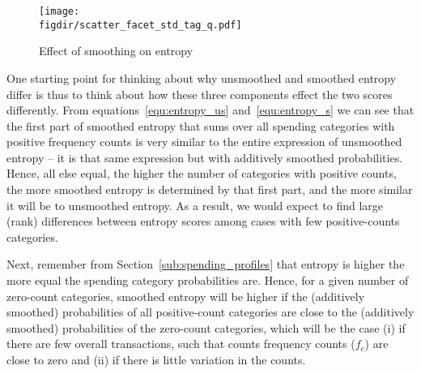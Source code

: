 \begin{figure}[ht]
    \centering 
    \caption{Effect of smoothing on entropy}
    \label{fig:scatter_facets}
    \texttt{[image: \\figdir/scatter\_facet\_std\_tag\_q.pdf]}
\end{figure}

One starting point for thinking about why unsmoothed and smoothed entropy
differ is thus to think about how these three components effect the two scores
differently. From equations~\ref{equ:entropy_us} and~\ref{equ:entropy_s} we can
see that the first part of smoothed entropy that sums over all spending
categories with positive frequency counts is very similar to the entire
expression of unsmoothed entropy -- it is that same expression but with
additively smoothed probabilities. Hence, all else equal, the higher the number
of categories with positive counts, the more smoothed entropy is determined by
that first part, and the more similar it will be to unsmoothed entropy. As a
result, we would expect to find large (rank) differences between entropy scores
among cases with few positive-counts categories.

Next, remember from Section~\ref{sub:spending_profiles} that entropy is higher
the more equal the spending category probabilities are. Hence, for a given
number of zero-count categories, smoothed entropy will be higher if the
(additively smoothed) probabilities of all positive-count categories are close
to the (additively smoothed) probabilities of the zero-count categories, which
will be the case (i) if there are few overall transactions, such that counts
frequency counts ($f_c$) are close to zero and (ii) if there is little
variation in the counts.

